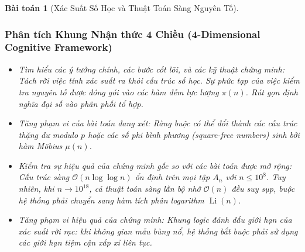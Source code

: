 \documentclass{article}
\newtheorem{baitoan}{Bài toán}
\begin{document}
\begin{baitoan}[Xác Suất Số Học và Thuật Toán Sàng Nguyên Tố]
 \subsubsection*{Phân tích Khung Nhận thức 4 Chiều (4-Dimensional Cognitive Framework)}
 \begin{itemize}
 \item \textit{Tìm hiểu các ý tưởng chính, các bước cốt lõi, và các kỹ thuật chứng minh}: Tách rời việc tính xác suất ra khỏi cấu trúc số học. Sự phức tạp của việc kiểm tra nguyên tố được đóng gói vào các hàm đếm lực lượng $\pi(n)$. Rút gọn định nghĩa đại số vào phân phối tổ hợp.
 \item \textit{Tăng phạm vi của bài toán đang xét}: Ràng buộc có thể đổi thành các cấu trúc thặng dư modulo $p$ hoặc các số phi bình phương (square-free numbers) sinh bởi hàm Möbius $\mu(n)$.
 \item \textit{Kiểm tra sự hiệu quả của chứng minh gốc so với các bài toán được mở rộng}: Cấu trúc sàng $\mathcal{O}(n \log \log n)$ ổn định trên mọi tập $A_n$ với $n \le 10^8$. Tuy nhiên, khi $n \to 10^{18}$, cả thuật toán sàng lẫn bộ nhớ $\mathcal{O}(n)$ đều suy sụp, buộc hệ thống phải chuyển sang hàm tích phân logarithm $\operatorname{Li}(n)$.
 \item \textit{Tăng phạm vi hiệu quả của chứng minh}: Khung logic đánh dấu giới hạn của xác suất rời rạc: khi không gian mẫu bùng nổ, hệ thống bắt buộc phải sử dụng các giới hạn tiệm cận xấp xỉ liên tục.
 \end{itemize}
\end{baitoan}

\end{document}
